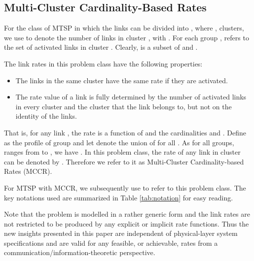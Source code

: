 \documentclass[10pt,onecolumn,journal,draftcls,oneside]{IEEEtran}
\begin{document}
\subsection{Multi-Cluster Cardinality-Based Rates}

For the class of MTSP in which the links can be divided into , where , clusters, we use  to denote the number of links in cluster , with .
For each group ,  refers to the set of activated links in cluster . Clearly,  is a subset of  and . 

The link rates in this problem class have the following properties:

\begin{itemize}
\item The links in the same cluster have the same rate if they are activated.
\item The rate value of a link is fully determined by the number of activated links in every cluster and the cluster that the link belongs to, but not on the identity of the links.
\end{itemize}

That is, for any link , the rate  is a function of  and the cardinalities  and . Define  as the profile of group  and let  denote the union of  for all . As for all  groups,  ranges from  to , we have .
In this problem class, the rate of any link in cluster  can be denoted by . Therefore we refer to it as Multi-Cluster Cardinality-based Rates (MCCR).

For MTSP with MCCR, we subsequently use  to refer to this problem class. The key notations used are summarized in Table \ref{tab:notation} for easy reading. 

Note that the problem is modelled in a rather generic form and the link rates are not restricted to be produced by any explicit or implicit rate functions. Thus the new insights presented in this paper are independent of physical-layer system specifications and are valid for any feasible, or achievable, rates from a communication/information-theoretic perspective.
\end{document}
